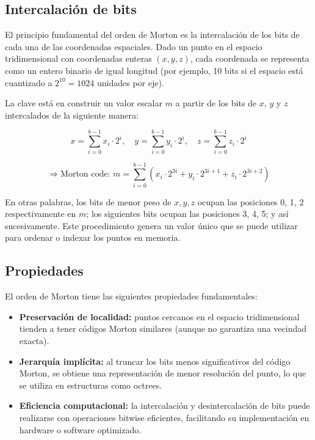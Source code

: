     \subsection{Intercalación de bits}
    
    El principio fundamental del orden de Morton es la intercalación de los bits de cada una de las coordenadas espaciales. Dado un punto en el espacio tridimensional con coordenadas enteras \((x, y, z)\), cada coordenada se representa como un entero binario de igual longitud (por ejemplo, 10 bits si el espacio está cuantizado a \(2^{10} = 1024\) unidades por eje).
    
    La clave está en construir un valor escalar \(m\) a partir de los bits de \(x\), \(y\) y \(z\) intercalados de la siguiente manera:
    
    \[
    x = \sum_{i=0}^{b-1} x_i \cdot 2^i, \quad
    y = \sum_{i=0}^{b-1} y_i \cdot 2^i, \quad
    z = \sum_{i=0}^{b-1} z_i \cdot 2^i
    \]
    
    \[
    \Rightarrow \text{Morton code: } 
    m = \sum_{i=0}^{b-1} \left( x_i \cdot 2^{3i} + y_i \cdot 2^{3i + 1} + z_i \cdot 2^{3i + 2} \right)
    \]
    
    En otras palabras, los bits de menor peso de \(x, y, z\) ocupan las posiciones 0, 1, 2 respectivamente en \(m\); los siguientes bits ocupan las posiciones 3, 4, 5; y así sucesivamente. Este procedimiento genera un valor único que se puede utilizar para ordenar o indexar los puntos en memoria.
    
    \subsection{Propiedades}
    
    El orden de Morton tiene las siguientes propiedades fundamentales:
    
    \begin{itemize}
        \item \textbf{Preservación de localidad:} puntos cercanos en el espacio tridimensional tienden a tener códigos Morton similares (aunque no garantiza una vecindad exacta).
        \item \textbf{Jerarquía implícita:} al truncar los bits menos significativos del código Morton, se obtiene una representación de menor resolución del punto, lo que se utiliza en estructuras como octrees.
        \item \textbf{Eficiencia computacional:} la intercalación y desintercalación de bits puede realizarse con operaciones bitwise eficientes, facilitando su implementación en hardware o software optimizado.
    \end{itemize}
    
